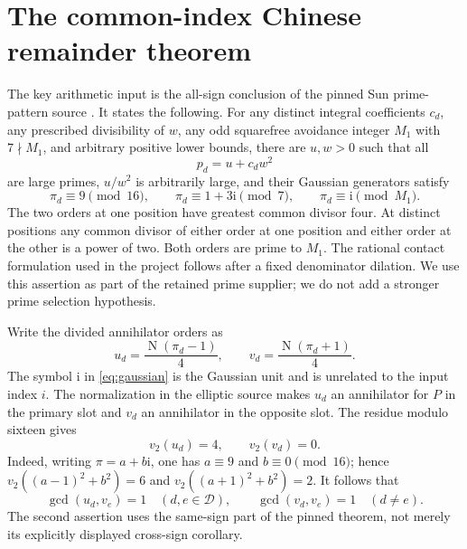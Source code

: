 \documentclass[11pt]{article}
\newcommand{\Nm}{\operatorname{N}}
\begin{document}
\section{The common-index Chinese remainder theorem}
\label{sec:crt}

The key arithmetic input is the all-sign conclusion of the pinned
Sun prime-pattern source \cite[Theorem 4.1, label
\texttt{an:thm:patterns}]{patterns}. It states the following.
For any distinct integral coefficients \(c_d\), any prescribed
divisibility of \(w\), any odd squarefree avoidance integer \(M_1\)
with \(7\nmid M_1\), and arbitrary positive lower bounds, there
are \(u,w>0\) such that all
\[
                    p_d=u+c_dw^2
\]
are large primes, \(u/w^2\) is arbitrarily large, and their
Gaussian generators satisfy
\begin{equation}\label{eq:gaussian}
 \pi_d\equiv9\pmod {16},\qquad
 \pi_d\equiv1+3\mathrm i\pmod7,\qquad
 \pi_d\equiv\mathrm i\pmod {M_1}.
\end{equation}
The two orders at one position have greatest common divisor four.
At distinct positions any common divisor of either order at one
position and either order at the other is a power of two.
Both orders are prime to \(M_1\). The rational contact formulation
used in the project follows after a fixed denominator dilation.
We use this assertion as part of the retained prime supplier;
we do not add a stronger prime selection hypothesis.

Write the divided annihilator orders as
\[
             u_d=\frac{\Nm(\pi_d-1)}4,\qquad
             v_d=\frac{\Nm(\pi_d+1)}4 .
\]
The symbol \(\mathrm i\) in \eqref{eq:gaussian} is the Gaussian
unit and is unrelated to the input index \(i\).
The normalization in the elliptic source makes \(u_d\) an
annihilator for \(P\) in the primary slot and \(v_d\) an
annihilator in the opposite slot. The residue modulo sixteen gives
\begin{equation}\label{eq:twodepth}
                     v_2(u_d)=4,\qquad v_2(v_d)=0 .
\end{equation}
Indeed, writing \(\pi=a+b\mathrm i\), one has \(a\equiv9\) and
\(b\equiv0\pmod {16}\); hence
\(v_2((a-1)^2+b^2)=6\) and
\(v_2((a+1)^2+b^2)=2\).
It follows that
\begin{equation}\label{eq:ordercoprime}
 \gcd(u_d,v_e)=1\quad(d,e\in\mathcal D),\qquad
 \gcd(v_d,v_e)=1\quad(d\ne e).
\end{equation}
The second assertion uses the same-sign part of the pinned theorem,
not merely its explicitly displayed cross-sign corollary.
\end{document}
